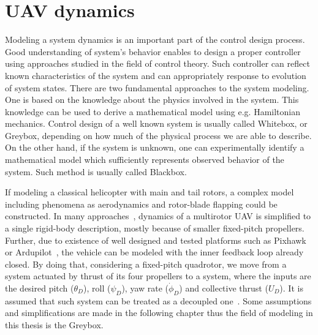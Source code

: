 \section{UAV dynamics}
\label{chap:uav_dynamics}

Modeling a system dynamics is an important part of the control design process. Good understanding of system's behavior enables to design a proper controller using approaches studied in the field of control theory. Such controller can reflect known characteristics of the system and can appropriately response to evolution of system states. There are two fundamental approaches to the system modeling. One is based on the knowledge about the physics involved in the system. This knowledge can be used to derive a mathematical model using e.g. Hamiltonian mechanics. Control design of a well known system is usually called Whitebox, or Greybox, depending on how much of the physical process we are able to describe. On the other hand, if the system is unknown, one can experimentally identify a mathematical model which sufficiently represents observed behavior of the system. Such method is usually called Blackbox.

If modeling a classical helicopter with main and tail rotors, a complex model including phenomena as aerodynamics and rotor-blade flapping could be constructed. In many approaches~\citep{alexis2014rmpc, mahony2012multirotor}, dynamics of a multirotor UAV is simplified to a single rigid-body description, mostly because of smaller fixed-pitch propellers. Further, due to existence of well designed and tested platforms such as Pixhawk~\citep{pixhawk} or Ardupilot~\citep{ardupilot}, the vehicle can be modeled with the inner feedback loop already closed. By doing that, considering a fixed-pitch quadrotor, we move from a system actuated by thrust of its four propellers to a system, where the inputs are the desired pitch ($\theta_D$), roll ($\psi_D$), yaw rate ($\dot{\phi}_D$) and collective thrust ($U_D$). It is assumed that such system can be treated as a decoupled one~\citep{mahony2012multirotor}. Some assumptions and simplifications are made in the following chapter thus the field of modeling in this thesis is the Greybox.


